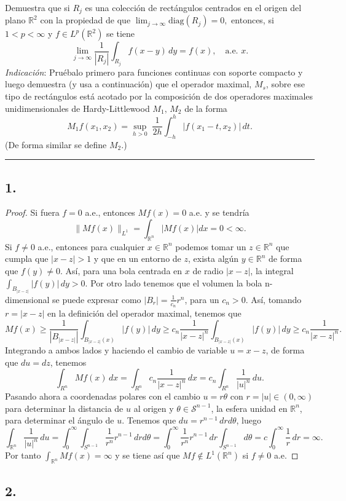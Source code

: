 \documentclass[11pt,a4paper]{article}
\begin{document}
    Demuestra que si $R_j$ es una colección de rectángulos centrados en el origen del plano $\mathbb R^2$ con la propiedad de que $\displaystyle \lim_{j\to\infty} \mbox{diag}(R_j)= 0,$ entonces, si $1<p<\infty$ y $f\in L^p(\mathbb R^2)$ se tiene
 $$
 \lim_{j\to\infty}\frac 1{|R_j|}\int_{R_j} f(x-y)\, dy = f(x), \quad \mbox{a.e. }  x.
 $$
 {\it Indicación}: Pruébalo primero para funciones continuas con soporte compacto y luego demuestra (y usa a continuación) que el operador maximal, $M_s$, sobre ese tipo de rectángulos está acotado por la composición de dos operadores maximales unidimensionales de Hardy-Littlewood $M_1, \, M_2$ de la forma
 $$
 M_1f(x_1,x_2)=\sup_{h>0}\; \frac1{2h}\int_{-h}^{h}|f(x_1-t,x_2)|\, dt.
 $$
 (De forma similar se define $M_2$.)
   
\vskip 6mm
\hrule
\vskip 5mm

\newpage
{} 

\subsection*{1.}
\begin{proof}
  Si fuera $ f = 0 $ a.e., entonces $ Mf(x) = 0 $ a.e. y se tendría
  $$
    \| Mf(x) \|_{L^1} = \int_{\mathbb R^n} |Mf(x)| dx = 0 < \infty.
  $$
  Si $ f \neq 0 $ a.e., entonces para cualquier $ x \in \mathbb R^n $ podemos tomar un $ z \in \mathbb R^n $ que cumpla que $ |x-z| > 1$ y que en un entorno de $ z $, exista algún $ y \in \mathbb R^n $ de forma que $ f(y) \neq 0 $. Así, para una bola centrada en $ x $ de radio $ |x-z| $, la integral 
  $
    \int_{B_{|x-z|}} |f(y)|\, dy > 0.
  $
  Por otro lado tenemos que el volumen la bola n-dimensional se puede expresar como
  $ |B_r| = \frac{1}{c_n} r^n $, para un $c_n > 0 $. Así, tomando $ r = |x-z| $ en la definición del operador maximal, tenemos que
  $$
    Mf(x) \geq \frac{1}{|B_{|x-z|}|} \int_{B_{|x-z|}(x)} |f(y)|\, dy \geq c_n \frac{1}{|x-z|^n} \int_{B_{|x-z|}(x)} |f(y)|\, dy \geq c_n \frac{1}{|x-z|^n}.
  $$
  Integrando a ambos lados y haciendo el cambio de variable $ u = x - z $, de forma que $ du = dz $, tenemos
  $$
    \int_{R^n} Mf(x) \, dx = \int_{R^n} c_n \frac{1}{|x-z|^n} \, dx = c_n \int_{R^n} \frac{1}{|u|^n} \, du.
  $$
  Pasando ahora a coordenadas polares con el cambio $ u = r\theta $ con $ r = |u| \in (0, \infty)$ para determinar la distancia de $ u $ al origen y $ \theta \in \mathcal S^{n-1} $, la esfera unidad en $ \mathbb R^n $, para determinar el ángulo de $ u $. Tenemos que $ du = r^{n-1} \, dr d\theta $, luego
  $$
    \int_{\mathbb R^n} \frac{1}{|u|^n} \, du = \int_{0}^\infty \int_{S^{n-1}} \frac{1}{r^n} r^{n-1} \, dr d\theta = \int_{0}^\infty \frac{1}{r^n} r^{n-1} \, dr \int_{S^{n-1}} d\theta = c \int_{0}^\infty \frac{1}{r} \, dr = \infty.
  $$
  Por tanto $ \int_{\mathbb R^n} Mf(x) = \infty $ y se tiene así que $ Mf \notin L^1(\mathbb R^n)$ si $f \neq 0$ a.e.
\end{proof}

\subsection*{2.}
\end{document}
